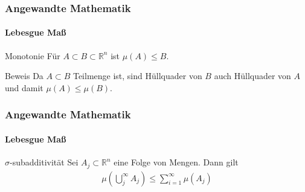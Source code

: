 \documentclass{beamer}
\begin{document}



\begin{frame}
    \frametitle{Angewandte Mathematik}
\framesubtitle{Lebesgue Maß}
    \begin{block}{Monotonie}
Für $A \subset B \subset \mathbb{R}^n$ ist $\mu(A) \leq B$.
\end{block}

    \begin{block}{Beweis}
Da $A \subset B$ Teilmenge ist, sind Hüllquader von $B$  auch Hüllquader von $A$ und damit  $\mu(A) \leq \mu(B)$.
\end{block}
 \end{frame}


\begin{frame}
    \frametitle{Angewandte Mathematik}
\framesubtitle{Lebesgue Maß}
    \begin{block}{$\sigma$-subadditivität}
Sei $A_j \subset \mathbb{R}^n$ eine Folge von Mengen. Dann gilt
\begin{align*}
\mu (\bigcup_j^{\infty} A_j ) \leq \sum_{i=1}^{\infty} \mu(A_j)
\end{align*}
\end{block}
 \end{frame}
\end{document}
